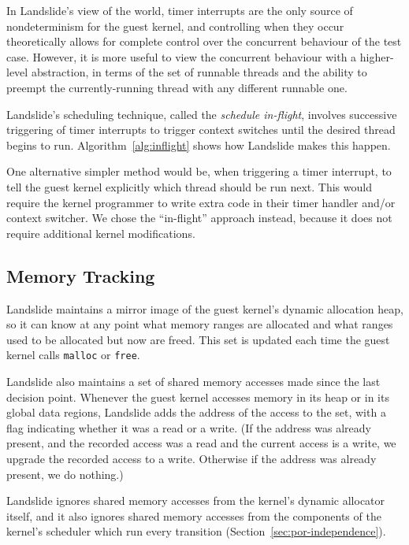 In Landslide's view of the world, timer interrupts are the only source of nondeterminism for the guest kernel, and controlling when they occur theoretically allows for complete control over the concurrent behaviour of the test case. However, it is more useful to view the concurrent behaviour with a higher-level abstraction, in terms of the set of runnable threads and the ability to preempt the currently-running thread with any different runnable one.

Landslide's scheduling technique, called the {\em schedule in-flight}, involves successive triggering of timer interrupts to trigger context switches until the desired thread begins to run. Algorithm~\ref{alg:inflight} shows how Landslide makes this happen.

One alternative simpler method would be, when triggering a timer interrupt, to tell the guest kernel explicitly which thread should be run next. This would require the kernel programmer to write extra code in their timer handler and/or context switcher. We chose the ``in-flight'' approach instead, because it does not require additional kernel modifications.

\subsection{Memory Tracking}
\label{sec:components-memory}

Landslide maintains a mirror image of the guest kernel's dynamic allocation heap, so it can know at any point what memory ranges are allocated and what ranges used to be allocated but now are freed. This set is updated each time the guest kernel calls \texttt{malloc} or \texttt{free}.

Landslide also maintains a set of shared memory accesses made since the last decision point. Whenever the guest kernel accesses memory in its heap or in its global data regions, Landslide adds the address of the access to the set, with a flag indicating whether it was a read or a write. (If the address was already present, and the recorded access was a read and the current access is a write, we upgrade the recorded access to a write. Otherwise if the address was already present, we do nothing.)

Landslide ignores shared memory accesses from the kernel's dynamic allocator itself, and it also ignores shared memory accesses from the components of the kernel's scheduler which run every transition (Section~\ref{sec:por-independence}).

